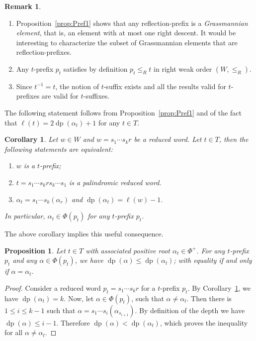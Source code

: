 \documentclass{amsart}
\newtheorem{Proposition}[Theorem]{Proposition}
\newtheorem{Corollary}[Theorem]{Corollary}
\theoremstyle{definition}
\newtheorem{Remark}[Theorem]{Remark}
\newcommand{\dep}{\operatorname{dp}}
\begin{document}
\begin{Remark} $\ $
\begin{enumerate}
\item  Proposition~\ref{prop:Pref1} shows that any reflection-prefix is a {\em Grassmannian element}, that is, an element with at most one right descent. It would be interesting to characterize the subset of Grassmannian elements that are reflection-prefixes.  
\item Any $t$-prefix $p_t$  satisfies by definition $p_t\leq_R t$ in right weak order $(W,\leq_R)$.
\item Since $t^{-1}=t$, the notion of $t$-suffix exists and all the results valid for $t$-prefixes are valid for $t$-suffixes.
\end{enumerate}
\end{Remark}



The following statement follows from Proposition~\ref{prop:Pref1} and of the fact that $\ell(t)=2\dep(\alpha_t)+1$ for any $t\in T$.

\begin{Corollary}\label{cor:Pref1} Let $w\in W$ and  $w=s_1\cdots s_k r$ be a reduced word. Let $t\in T$, then the following statements are equivalent:
\begin{enumerate}
\item $w$ is a $t$-prefix;
\item   $t=s_1\cdots s_k r s_k\cdots s_1$ is a palindromic reduced word.
\item $\alpha_t=s_1\cdots s_k(\alpha_r)$ and $\dep(\alpha_t)=\ell(w)-1$.
\end{enumerate}
In particular, $\alpha_t\in \Phi(p_t)$ for any $t$-prefix $p_t$.
\end{Corollary}

The above corollary implies this useful consequence. 

\begin{Proposition}\label{prop:PrefDepth} Let $t\in T$ with associated positive root $\alpha_t\in \Phi^+$. For any $t$-prefix $p_t$ and any $\alpha\in \Phi(p_t)$, we have $\dep(\alpha)\leq \dep(\alpha_t)$; with equality if and only if $\alpha=\alpha_t$. 
\end{Proposition}
\begin{proof} Consider a reduced word $p_t=s_1\cdots s_kr$ for a $t$-prefix $p_t$. 
By Corollary~\ref{cor:Pref1}, we have $\dep(\alpha_t)=k$.
Now, let $\alpha\in \Phi(p_t)$, such that $\alpha \neq \alpha_t$.
Then there is $1\leq i\leq k-1$ such that $\alpha=s_1\cdots s_i(\alpha_{s_{i+1}})$. By definition of the depth we have
$\dep(\alpha)\leq i-1$. Therefore $\dep(\alpha)<\dep(\alpha_t)$, which proves the inequality for all $\alpha\neq \alpha_t$.
\end{proof}
\end{document}
